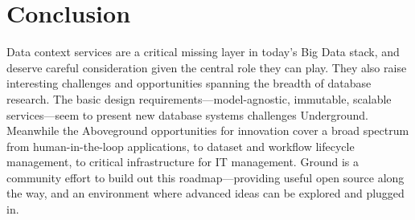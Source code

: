 \documentclass{sig-alternate}
\begin{document}
\section{Conclusion}
\label{sec:conclusion}
Data context services are a critical missing layer in today's Big Data stack, and deserve careful consideration given the central role they can play. 
They also raise interesting challenges and opportunities spanning the breadth of database research. 
The basic design requirements---model-agnostic, immutable, scalable services---seem to present new database systems challenges Underground. 
Meanwhile the Aboveground opportunities for innovation cover a broad spectrum from human-in-the-loop applications, to dataset and workflow lifecycle management, to critical infrastructure for IT management. 
Ground is a community effort to build out this roadmap---providing useful open source along the way, and an environment where advanced ideas can be explored and plugged in.


\end{document}
